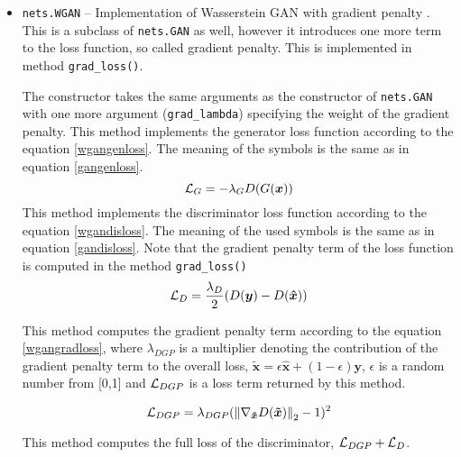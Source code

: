 \begin{itemize}
\begin{description}
\end{description}
\item \texttt{nets.WGAN} -- Implementation of Wasserstein GAN with gradient penalty \cite{wgan}. This is a subclass of \texttt{nets.GAN} as well, however it introduces one more term to the loss function, so called gradient penalty. This is implemented in method \texttt{grad\_loss()}.
\begin{description}
 The constructor takes the same arguments as the constructor of \texttt{nets.GAN} with one more argument (\texttt{grad\_lambda}) specifying the weight of the gradient penalty.
 This method implements the generator loss function according to the equation \ref{wgangenloss}. The meaning of the symbols is the same as in equation \ref{gangenloss}.
\begin{equation}
\mathcal{L}_G = -\lambda_GD(G(\bm{x}))
\label{wgangenloss}
\end{equation}
 This method implements the discriminator loss function according to the equation \ref{wgandisloss}. The meaning of the used symbols is the same as in equation \ref{gandisloss}. Note that the gradient penalty term of the loss function is computed in the method \texttt{grad\_loss()}
\begin{equation}
\mathcal{L}_D = \frac{\lambda_D}{2}(D(\bm{y}) - D(\bm{\hat{x}}))
\label{wgandisloss}
\end{equation}

 This method computes the gradient penalty term according to the equation \ref{wgangradloss}, where $\lambda_{DGP}$ is a multiplier denoting the contribution of the gradient penalty term to the overall loss, $\bm{\tilde{x}} = \epsilon\bm{\hat{x}} + (1-\epsilon)\bm{y}$, $\epsilon$ is a random number from [0,1] and $\mathcal{L}_{DGP}$ is a loss term returned by this method.

\begin{equation}
\mathcal{L}_{DGP} = \lambda_{DGP}(\left\lVert\nabla_{\bm{\tilde{x}}}D(\bm{\tilde{x}})\right\rVert_2 - 1)^2
\label{wgangradloss}
\end{equation}

 This method computes the full loss of the discriminator, $\mathcal{L}_{DGP} + \mathcal{L}_D$.
\end{description}
\end{itemize}

